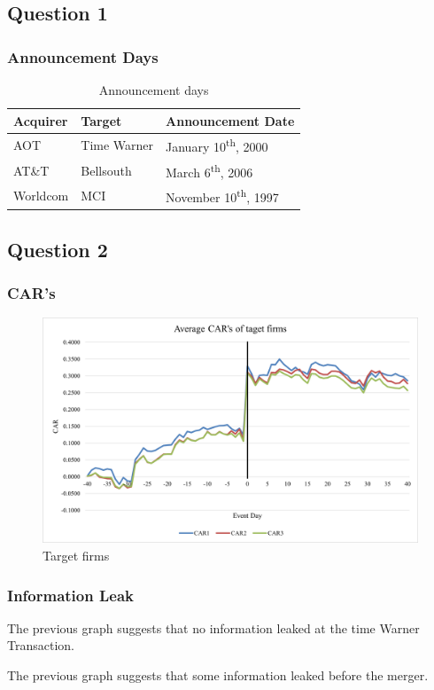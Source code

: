 \documentclass{beamer}
\begin{document}
\subsection{Question 1}
\begin{frame}
\frametitle{Announcement Days}
\begin{table}[H]
	\centering
	\begin{tabular}{|l|l|l|}
		\toprule
		Acquirer & Target & Announcement Date \\\toprule
		AOT& Time Warner & January 10\textsuperscript{th}, 2000 \\
		AT\&T& Bellsouth& March 6\textsuperscript{th}, 2006\\
		Worldcom& MCI& November 10\textsuperscript{th}, 1997\\ \hline
	\end{tabular}
	\caption{Announcement days}
	\label{aanounce}
\end{table}
\end{frame}

\subsection{Question 2}
\begin{frame}
\frametitle{CAR's}
\begin{figure}[H]
	\centering
	\includegraphics[scale=0.35]{images/Bild1.png}
	\caption{Target firms}
	\label{bildlitargets}
\end{figure}
\end{frame}


\begin{frame} %
\frametitle{Information Leak}
\begin{example}
	The previous graph suggests that no information leaked at the time Warner Transaction.
\end{example}
\begin{example}[Bellsouth]
	The previous graph suggests that some information leaked before the merger.
\end{example}
\end{frame}
\end{document}
